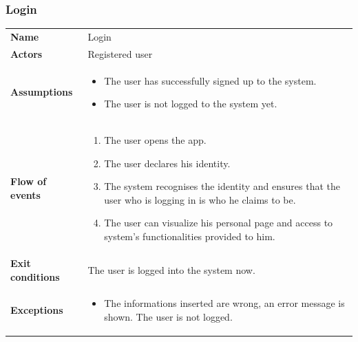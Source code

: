 \documentclass[english]{article}
\begin{document}
		\subsubsection{Login}
		\begin{center}
		\begin{tabular}{l||p{10cm}}
		\textbf{Name} 
			& Login\\ [8px]
		\textbf{Actors} 
			& Registered user\\ [8px]
		\textbf{Assumptions} 
			& \begin{itemize}
				\item The user has successfully signed up to the system.
				\item The user is not logged to the system yet.
			\end{itemize}\\
		\textbf{Flow of events}
			& \begin{enumerate}
	 			\item The user opens the app.
				\item The user declares his identity.
				\item The system recognises the identity and ensures that the user who is logging in is who he claims to be.
				\item The user can visualize his personal page and access to system's functionalities provided to him.
			\end{enumerate}\\ 
		\textbf{Exit conditions}
			& The user is logged into the system now.\\ [8px]
		\textbf{Exceptions}
			& \begin{itemize}
				\item The informations inserted are wrong, an error message is shown. The user is not logged.
			\end{itemize}
		\end{tabular}
		\end{center}
		\noindent
\end{document}
